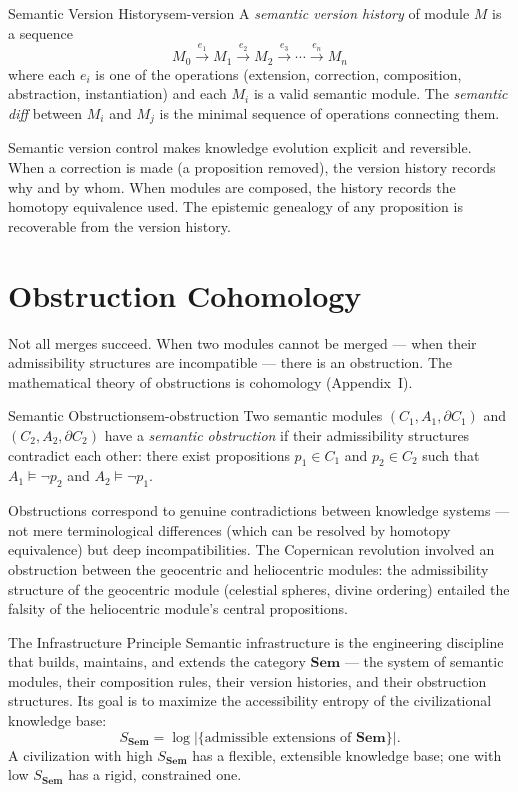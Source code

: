 \begin{definition}{Semantic Version History}{sem-version}
  A \emph{semantic version history} of module $M$ is a sequence
  \[
    M_0 \xrightarrow{e_1} M_1 \xrightarrow{e_2} M_2 \xrightarrow{e_3}
    \cdots \xrightarrow{e_n} M_n
  \]
  where each $e_i$ is one of the operations (extension, correction,
  composition, abstraction, instantiation) and each $M_i$ is a valid
  semantic module. The \emph{semantic diff} between $M_i$ and $M_j$
  is the minimal sequence of operations connecting them.
\end{definition}

Semantic version control makes knowledge evolution explicit and
reversible. When a correction is made (a proposition removed), the
version history records why and by whom. When modules are composed,
the history records the homotopy equivalence used. The epistemic
genealogy of any proposition is recoverable from the version history.

\section{Obstruction Cohomology}

Not all merges succeed. When two modules cannot be merged — when their
admissibility structures are incompatible — there is an obstruction.
The mathematical theory of obstructions is cohomology (Appendix~I).

\begin{definition}{Semantic Obstruction}{sem-obstruction}
  Two semantic modules $(C_1, A_1, \partial C_1)$ and $(C_2, A_2,
  \partial C_2)$ have a \emph{semantic obstruction} if their
  admissibility structures contradict each other: there exist
  propositions $p_1 \in C_1$ and $p_2 \in C_2$ such that
  $A_1 \models \neg p_2$ and $A_2 \models \neg p_1$.
\end{definition}

Obstructions correspond to genuine contradictions between knowledge
systems — not mere terminological differences (which can be resolved by
homotopy equivalence) but deep incompatibilities. The Copernican
revolution involved an obstruction between the geocentric and
heliocentric modules: the admissibility structure of the geocentric
module (celestial spheres, divine ordering) entailed the falsity
of the heliocentric module's central propositions.

\begin{namedthm}{The Infrastructure Principle}
  Semantic infrastructure is the engineering discipline that builds,
  maintains, and extends the category $\mathbf{Sem}$ — the system
  of semantic modules, their composition rules, their version histories,
  and their obstruction structures. Its goal is to maximize the
  accessibility entropy of the civilizational knowledge base:
  \[
    S_{\mathbf{Sem}} = \log \bigl|\{\text{admissible extensions of }
    \mathbf{Sem}\}\bigr|.
  \]
  A civilization with high $S_{\mathbf{Sem}}$ has a flexible,
  extensible knowledge base; one with low $S_{\mathbf{Sem}}$ has
  a rigid, constrained one.
\end{namedthm}

